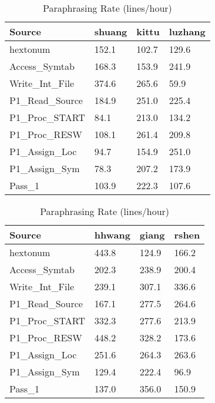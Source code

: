 \begin{table}[hb]
\begin{center}
\begin{tabular}{|l|l|l|l|}
\hline
Source & shuang & kittu & luzhang\\
\hline
hextonum & 152.1 & 102.7 & 129.6\\
Access\_Symtab & 168.3 & 153.9 & 241.9\\
Write\_Int\_File & 374.6 & 265.6 & 59.9\\
P1\_Read\_Source & 184.9 & 251.0 & 225.4\\
P1\_Proc\_START & 84.1 & 213.0 & 134.2\\
P1\_Proc\_RESW & 108.1 & 261.4 & 209.8\\
P1\_Assign\_Loc & 94.7 & 154.9 & 251.0\\
P1\_Assign\_Sym & 78.3 & 207.2 & 173.9\\
Pass\_1 & 103.9 & 222.3 & 107.6\\
\hline
\end{tabular}
\end{center}
\caption{Paraphrasing Rate (lines/hour)}
\end{table}

\begin{table}[hb]
\begin{center}
\begin{tabular}{|l|l|l|l|}
\hline
Source & hhwang & giang & rshen\\
\hline
hextonum & 443.8 & 124.9 & 166.2\\
Access\_Symtab & 202.3 & 238.9 & 200.4\\
Write\_Int\_File & 239.1 & 307.1 & 336.6\\
P1\_Read\_Source & 167.1 & 277.5 & 264.6\\
P1\_Proc\_START & 332.3 & 277.6 & 213.9\\
P1\_Proc\_RESW & 448.2 & 328.2 & 173.6\\
P1\_Assign\_Loc & 251.6 & 264.3 & 263.6\\
P1\_Assign\_Sym & 129.4 & 222.4 & 96.9\\
Pass\_1 & 137.0 & 356.0 & 150.9\\
\hline
\end{tabular}
\end{center}
\caption{Paraphrasing Rate (lines/hour)}
\end{table}

